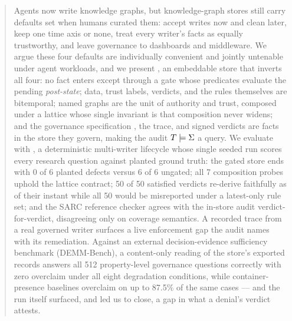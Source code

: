 \begin{abstract}
Agents now write knowledge graphs, but knowledge-graph stores still
carry defaults set when humans curated them: accept writes now and
clean later, keep one time axis or none, treat every writer's facts as
equally trustworthy, and leave governance to dashboards and middleware.
We argue these four defaults are individually convenient and jointly
untenable under agent workloads, and we present \sys, an embeddable
store that inverts all four: no fact enters except through a gate whose
predicates evaluate the pending \emph{post-state}; data, trust labels,
verdicts, and the rules themselves are bitemporal; named graphs are the
unit of authority and trust, composed under a lattice whose single
invariant is that composition never widens; and the governance
specification \Sig, the trace, and signed verdicts are facts in the
store they govern, making the audit $T \entails \Sig$ a query.
We evaluate with \census, a deterministic multi-writer lifecycle whose
single seeded run scores every research question against planted ground
truth: the gated store ends with 0 of 6 planted defects versus 6 of 6
ungated; all 7 composition probes uphold the lattice contract;
50 of 50 satisfied verdicts re-derive faithfully as of their instant
while all 50 would be misreported under a latest-only rule set; and the
SARC reference checker agrees with the in-store audit verdict-for-verdict,
disagreeing only on coverage semantics. A recorded trace from a real
governed writer surfaces a live enforcement gap the audit names with
its remediation. Against an external decision-evidence sufficiency
benchmark (DEMM-Bench), a content-only reading of the store's exported
records answers all 512 property-level governance questions correctly
with zero overclaim under all eight degradation conditions, while
container-presence baselines overclaim on up to 87.5\% of the same
cases --- and the run itself surfaced, and led us to close, a gap in
what a denial's verdict attests.
\end{abstract}
